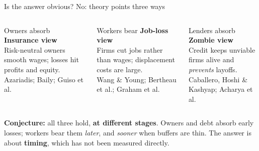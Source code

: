 \documentclass[aspectratio=169,11pt]{beamer}
\newcommand{\hl}[1]{{\color{WarmAmber}\bfseries #1}}
\newcommand{\muted}[1]{{\color{CoolGray}#1}}
\begin{document}
\begin{frame}{Is the answer obvious? No: theory points three ways}
  \begin{columns}[T,onlytextwidth]
    \begin{cardbox}{Owners absorb}
      \textbf{Insurance view}\\[2pt]
      Risk-neutral owners smooth wages; losses hit profits and equity.\\[3pt]
      \muted{Azariadis; Baily; Guiso et al.}
    \end{cardbox}

    \begin{cardbox}{Workers bear}
      \textbf{Job-loss view}\\[2pt]
      Firms cut jobs rather than wages; displacement costs are large.\\[3pt]
      \muted{Wang \& Young; Bertheau et al.; Graham et al.}
    \end{cardbox}

    \begin{cardbox}{Lenders absorb}
      \textbf{Zombie view}\\[2pt]
      Credit keeps unviable firms alive and \emph{prevents} layoffs.\\[3pt]
      \muted{Caballero, Hoshi \& Kashyap; Acharya et al.}
    \end{cardbox}
  \end{columns}

  \vspace{6pt}
  \begin{keybox}
    \small\textbf{Conjecture:} all three hold, \hl{at different stages}. Owners and debt absorb early losses;
    workers bear them \emph{later}, and \emph{sooner} when buffers are thin. The answer is about \textbf{timing}, which has not been measured directly.
  \end{keybox}
\end{frame}
\end{document}
